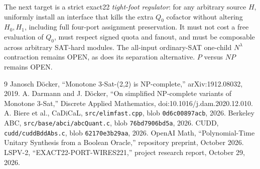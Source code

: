 \documentclass[11pt]{article}
\begin{document}
The next target is a strict exact22 \emph{tight-foot regulator}: for any arbitrary source $H$, uniformly install an interface that kills the extra $Q_0$ cofactor without altering $H_0,H_1$, including full four-port assignment preservation. It must not cost a free evaluation of $Q_0$, must respect signed quota and fanout, and must be composable across arbitrary SAT-hard modules. The all-input ordinary-SAT one-child $N^\lambda$ contraction remains OPEN, as does its separation alternative. $P$ versus $NP$ remains OPEN.

\begin{thebibliography}{9}
 Janosch D\"ocker, ``Monotone 3-Sat-(2,2) is NP-complete,'' arXiv:1912.08032, 2019.
 A. Darmann and J. D\"ocker, ``On simplified NP-complete variants of Monotone 3-Sat,'' Discrete Applied Mathematics, doi:10.1016/j.dam.2020.12.010.
 A. Biere et al., CaDiCaL, \texttt{src/elimfast.cpp}, blob \texttt{0d6c00897acb}, 2026.
 Berkeley ABC, \texttt{src/base/abci/abcQuant.c}, blob \texttt{76bd7906bd5a}, 2026.
 CUDD, \texttt{cudd/cuddBddAbs.c}, blob \texttt{62170e3b29aa}, 2026.
 OpenAI Math, ``Polynomial-Time Unitary Synthesis from a Boolean Oracle,'' repository preprint, October 2026.
 LSPV-2, ``EXACT22-PORT-WIRES221,'' project research report, October 29, 2026.
\end{thebibliography}
\end{document}
